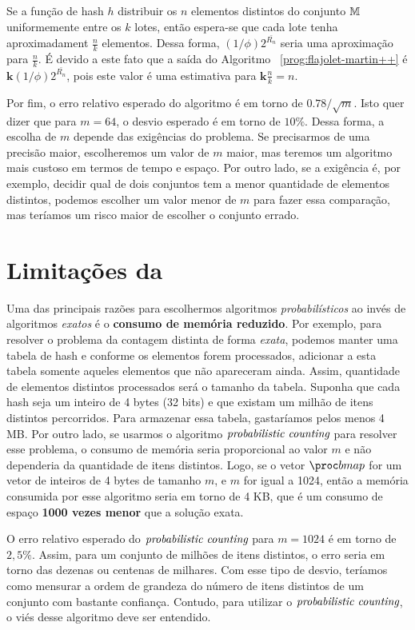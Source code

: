 Se a função de hash $h$ distribuir os $n$ elementos distintos do conjunto $\mathbb{M}$ uniformemente entre os 
$k$ lotes, então espera-se que cada lote tenha aproximadament $\frac{n}{k}$ elementos. Dessa forma, 
$(1 / \phi)2^{\bar{R_n}}$ seria uma aproximação para $\frac{n}{k}$. É devido a este fato que a saída do Algoritmo~
\ref{prog:flajolet-martin++} é $\mathbf{k} (1 / \phi)2^{\bar{R_n}}$, pois este valor é uma estimativa para 
$\mathbf{k} \frac{n}{k} = n$.

Por fim, o erro relativo esperado do algoritmo  é em torno de $0.78 / \sqrt{m}$. Isto quer 
dizer que para $m = 64$, o desvio esperado é em torno de $10\%$. Dessa forma, a escolha de $m$ depende das exigências do 
problema. Se precisarmos de uma precisão maior, escolheremos um valor de $m$  maior, mas teremos um algoritmo mais 
custoso em termos de tempo e espaço. Por outro lado, se a exigência é, por exemplo, decidir qual de dois conjuntos tem a 
menor quantidade de elementos distintos, podemos escolher um valor menor de $m$ para fazer essa comparação, mas teríamos 
um risco maior de escolher o conjunto errado.

\section{Limitações da }

Uma das principais razões para escolhermos algoritmos \textit{probabilísticos} ao invés de algoritmos \textit{exatos} é 
o \textbf{consumo de memória reduzido}. Por exemplo, para resolver o problema da contagem distinta de forma 
\textit{exata}, podemos manter uma tabela de hash e conforme os elementos forem processados, adicionar a esta tabela 
somente aqueles elementos que não apareceram ainda. Assim,  quantidade de elementos distintos processados será o tamanho 
da tabela. Suponha que cada hash seja um inteiro de 4 bytes (32 bits) e que existam um milhão de itens distintos 
percorridos. Para armazenar essa tabela, gastaríamos pelos menos 4 MB. Por outro lado, se usarmos o algoritmo 
$\textit{probabilistic counting}$ para resolver esse problema, o consumo de memória seria proporcional ao valor $m$ e não dependeria da 
quantidade de itens distintos. Logo, se o vetor $\bitmap$ for um vetor de inteiros de 4 bytes de tamanho $m$, e 
$m$ for igual a 1024, então a memória consumida por esse algoritmo seria em torno de 4 KB, que é um consumo de espaço
\textbf{1000 vezes menor} que a solução exata.

O erro relativo esperado do $\textit{probabilistic counting}$ para $m = 1024$ é em torno de $2{,}5\%$. Assim, para um conjunto de milhões de 
itens distintos, o erro seria em torno das dezenas ou centenas de milhares. Com esse tipo de desvio, teríamos como 
mensurar a ordem de grandeza do número de itens distintos de um conjunto com bastante confiança. Contudo, para utilizar
o $\textit{probabilistic counting}$, o viés desse algoritmo deve ser entendido.

